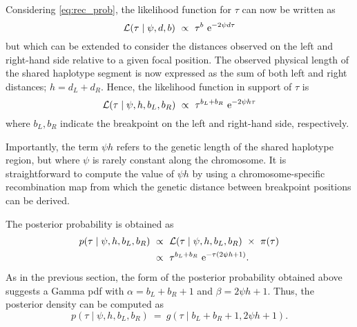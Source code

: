 Considering \cref{eq:rec_prob}, the likelihood function for $\tau$ can now be written as
\begin{equation}\label{eq:rec_like_x}
	\mathcal{L}(\tau \mid \psi,d,b)~\propto~\tau^b \,\,\mathrm{e}^{-2\psi d \tau}
\end{equation}
but which can be extended to consider the distances observed on the left and right-hand side relative to a given focal position.
The observed physical length of the shared haplotype segment is now expressed as the sum of both left and right distances; \ie ${h = d_L + d_R}$.
Hence, the likelihood function in support of $\tau$ is
\begin{equation}\label{eq:rec_like}
	\mathcal{L}(\tau \mid \psi,h,b_L,b_R)~\propto~\tau^{b_L + b_R} \,\,\mathrm{e}^{-2\psi h \tau}
\end{equation}
where ${b_L,b_R}$ indicate the breakpoint on the left and right-hand side, respectively.

Importantly, the term ${\psi h}$ refers to the genetic length of the shared haplotype region, but where $\psi$ is rarely constant along the chromosome.
It is straightforward to compute the value of ${\psi h}$ by using a chromosome-specific recombination map from which the genetic distance between breakpoint positions can be derived.

The posterior probability is obtained as
\begin{equation}\label{eq:rec_post}
\begin{split}
	p(\tau \mid \psi,h,b_L,b_R)
	&~\propto~
	\mathcal{L}(\tau \mid \psi, h, b_L, b_R)~\times~\pi(\tau) \\
	&~\propto~
	\tau^{b_L + b_R} \,\,\mathrm{e}^{-\tau(2\psi h +1)}\text{.}
\end{split}
\end{equation}
As in the previous section, the form of the posterior probability obtained above suggests a Gamma \gls{pdf} with ${\alpha = b_L + b_R +1}$ and ${\beta = 2\psi h +1}$.
Thus, the posterior density can be computed as
\begin{equation}
	p(\tau \mid \psi,h,b_L,b_R)~=~g(\tau\mid b_L + b_R +1, 2\psi h +1)\text{.}
\end{equation}




